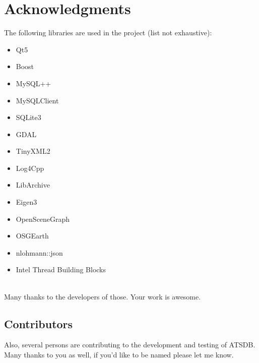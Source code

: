  \section{Acknowledgments}

The following libraries are used in the project (list not exhaustive):

\begin{itemize}  
\item Qt5
\item Boost
\item MySQL++
\item MySQLClient
\item SQLite3
\item GDAL
\item TinyXML2
\item Log4Cpp
\item LibArchive
\item Eigen3
\item OpenSceneGraph
\item OSGEarth
\item nlohmann::json
\item Intel Thread Building Blocks
\end{itemize}
\ \\

Many thanks to the developers of those. Your work is awesome.

\subsection{Contributors}

Also, several persons are contributing to the development and testing of ATSDB. Many thanks to you as well, if you'd like to be named please let me know.
